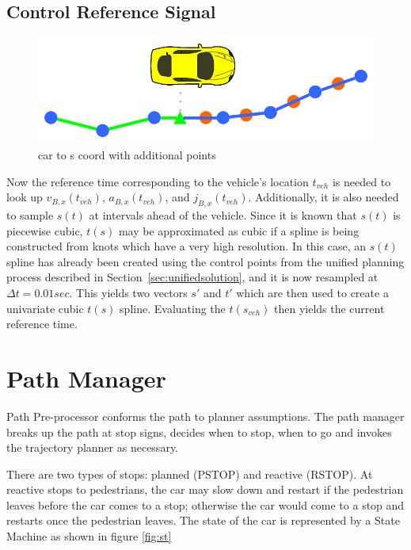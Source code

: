 \documentclass[letterpaper, 10 pt, conference]{ieeeconf}  %
\begin{document}
\subsection{Control Reference Signal} \label{sec:controlreferencesignal}

\begin{figure}[thpb]
  \centering
  \includegraphics[width=0.5\columnwidth]{graphics/PathProjectionSlice.png}
  \caption{car to s coord with additional points}
  \label{fig:cartos2}
\end{figure}

Now the reference time corresponding to the vehicle's location $t_{veh}$ is needed to look up $v_{B,x}(t_{veh})$, $a_{B,x}(t_{veh})$, and $j_{B,x}(t_{veh})$.
Additionally, it is also needed to sample $s(t)$ at intervals ahead of the vehicle.
Since it is known that $s(t)$ is piecewise cubic, $t(s)$ may be approximated as cubic if a spline is being constructed from knots which have a very high resolution.
In this case, an $s(t)$ spline has already been created using the control points from the unified planning process described in Section~\ref{sec:unifiedsolution}, and it is now resampled at $\Delta t = 0.01 sec$.
This yields two vectors $s'$ and $t'$ which are then used to create a univariate cubic $t(s)$ spline.
Evaluating the $t(s_{veh})$ then yields the current reference time.


\section{Path Manager} \label{sec:pathmanager}


Path Pre-processor conforms the path to planner assumptions.
The path manager breaks up the
path at stop signs, decides when to stop, when to go and invokes the trajectory planner
as necessary.

There are two types of stops: planned (PSTOP) and reactive (RSTOP).
At reactive stops
to pedestrians, the car may slow down and restart if the pedestrian leaves before the
car comes to a stop; otherwise the car would come to a stop and restarts once the 
pedestrian leaves.
The state of the car is represented by a State Machine as shown in figure \ref{fig:st}
\end{document}
